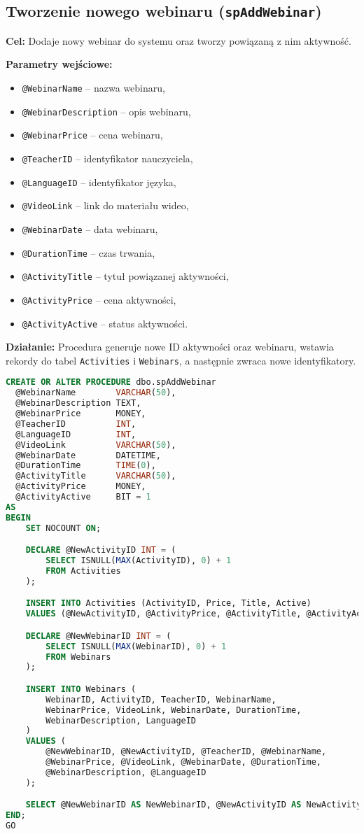 \documentclass[12pt]{article}
\begin{document}
\newpage
\subsection{Tworzenie nowego webinaru (\texttt{spAddWebinar})}
\textbf{Cel:} Dodaje nowy webinar do systemu oraz tworzy powiązaną z nim aktywność.

\textbf{Parametry wejściowe:}
\begin{itemize}
  \item \verb|@WebinarName| – nazwa webinaru,
  \item \verb|@WebinarDescription| – opis webinaru,
  \item \verb|@WebinarPrice| – cena webinaru,
  \item \verb|@TeacherID| – identyfikator nauczyciela,
  \item \verb|@LanguageID| – identyfikator języka,
  \item \verb|@VideoLink| – link do materiału wideo,
  \item \verb|@WebinarDate| – data webinaru,
  \item \verb|@DurationTime| – czas trwania,
  \item \verb|@ActivityTitle| – tytuł powiązanej aktywności,
  \item \verb|@ActivityPrice| – cena aktywności,
  \item \verb|@ActivityActive| – status aktywności.
\end{itemize}

\textbf{Działanie:} Procedura generuje nowe ID aktywności oraz webinaru, wstawia rekordy do tabel \verb|Activities| i \verb|Webinars|, a następnie zwraca nowe identyfikatory.

\begin{lstlisting}[language=SQL]
CREATE OR ALTER PROCEDURE dbo.spAddWebinar
  @WebinarName        VARCHAR(50),
  @WebinarDescription TEXT,
  @WebinarPrice       MONEY,
  @TeacherID          INT,
  @LanguageID         INT,
  @VideoLink          VARCHAR(50),
  @WebinarDate        DATETIME,
  @DurationTime       TIME(0),
  @ActivityTitle      VARCHAR(50),
  @ActivityPrice      MONEY,
  @ActivityActive     BIT = 1
AS
BEGIN
    SET NOCOUNT ON;

    DECLARE @NewActivityID INT = (
        SELECT ISNULL(MAX(ActivityID), 0) + 1
        FROM Activities
    );

    INSERT INTO Activities (ActivityID, Price, Title, Active)
    VALUES (@NewActivityID, @ActivityPrice, @ActivityTitle, @ActivityActive);

    DECLARE @NewWebinarID INT = (
        SELECT ISNULL(MAX(WebinarID), 0) + 1
        FROM Webinars
    );

    INSERT INTO Webinars (
        WebinarID, ActivityID, TeacherID, WebinarName,
        WebinarPrice, VideoLink, WebinarDate, DurationTime,
        WebinarDescription, LanguageID
    )
    VALUES (
        @NewWebinarID, @NewActivityID, @TeacherID, @WebinarName,
        @WebinarPrice, @VideoLink, @WebinarDate, @DurationTime,
        @WebinarDescription, @LanguageID
    );

    SELECT @NewWebinarID AS NewWebinarID, @NewActivityID AS NewActivityID;
END;
GO
\end{lstlisting}
\end{document}
